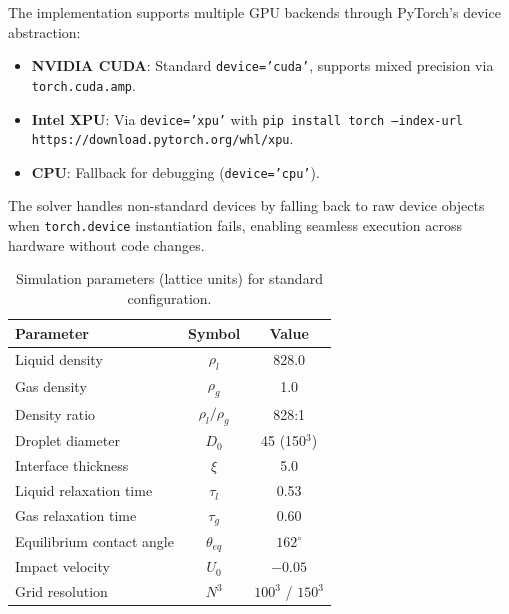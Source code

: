 The implementation supports multiple GPU backends through PyTorch's device abstraction:

\begin{itemize}
    \item \textbf{NVIDIA CUDA}: Standard \texttt{device='cuda'}, supports mixed precision via \texttt{torch.cuda.amp}.
    \item \textbf{Intel XPU}: Via \texttt{device='xpu'} with \texttt{pip install torch --index-url https://download.pytorch.org/whl/xpu}.
    \item \textbf{CPU}: Fallback for debugging (\texttt{device='cpu'}).
\end{itemize}

The solver handles non-standard devices by falling back to raw device objects when \texttt{torch.device} instantiation fails, enabling seamless execution across hardware without code changes.

\begin{table}[htbp]
    \centering
    \caption{Simulation parameters (lattice units) for standard configuration.}
    \label{tab:params}
    \begin{tabular}{lcc}
        \toprule
        Parameter & Symbol & Value \\
        \midrule
        Liquid density & $\rho_l$ & 828.0 \\
        Gas density & $\rho_g$ & 1.0 \\
        Density ratio & $\rho_l/\rho_g$ & 828:1 \\
        Droplet diameter & $D_0$ & 45 (150$^3$) \\
        Interface thickness & $\xi$ & 5.0 \\
        Liquid relaxation time & $\tau_l$ & 0.53 \\
        Gas relaxation time & $\tau_g$ & 0.60 \\
        Equilibrium contact angle & $\theta_{eq}$ & $162^\circ$ \\
        Impact velocity & $U_0$ & $-0.05$ \\
        Grid resolution & $N^3$ & $100^3$ / $150^3$ \\
        \bottomrule
    \end{tabular}
\end{table}
